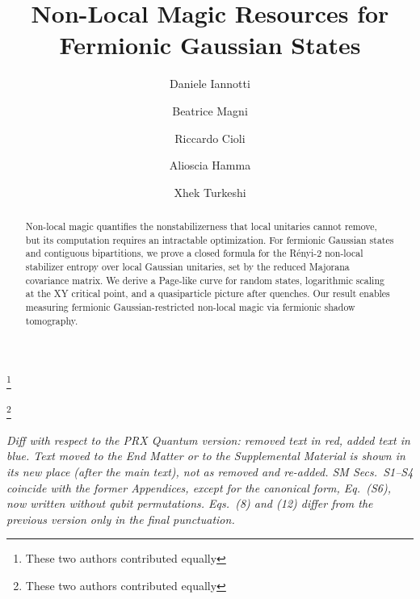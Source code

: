 \documentclass[aps,prl,twocolumn,superscriptaddress,reprint,longbibliography,nofootinbib]{revtex4-2}
\begin{document}
\title{Non-Local Magic Resources for Fermionic Gaussian States}

\author{Daniele Iannotti}
\thanks{These two authors contributed equally}

\author{Beatrice Magni}
\thanks{These two authors contributed equally}

\author{Riccardo Cioli}

\author{Alioscia Hamma}

\author{Xhek Turkeshi}

\begin{abstract}
Non-local magic quantifies the nonstabilizerness that local unitaries cannot remove, but its computation requires an intractable optimization. For fermionic Gaussian states and contiguous bipartitions, we prove a closed formula for the R\'enyi-2 non-local stabilizer entropy over local Gaussian unitaries, set by the reduced Majorana covariance matrix. We derive a Page-like curve for random states, logarithmic scaling at the XY critical point, and a quasiparticle picture after quenches. Our result enables measuring fermionic Gaussian-restricted non-local magic via fermionic shadow tomography.
\end{abstract}
\maketitle
\noindent\textit{Diff with respect to the PRX Quantum version: removed text in red, added text in blue. Text moved to the End Matter or to the Supplemental Material is shown in its new place (after the main text), not as removed and re-added. SM Secs.~S1--S4 coincide with the former Appendices, except for the canonical form, Eq.~(S6), now written without qubit permutations. Eqs.~(8) and (12) differ from the previous version only in the final punctuation.}
\end{document}
